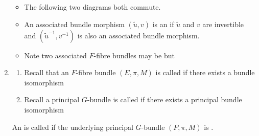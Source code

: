 \documentclass{article}
\begin{document}
\begin{enumerate}
\begin{itemize}
    \item {} The following two diagrams both commute.
\bse
{}
\qquad \quad
{}
\ese
\item {}
An associated bundle morphism $(\widetilde u,v)$ is an  if $\widetilde u$ and $v$ are invertible and $(\widetilde u^{-1},v^{-1})$ is also an associated bundle morphism.
\item Note two associated $F$-fibre bundles may be  but 
\end{itemize}

\item {}
{\tiny \begin{enumerate}
    \item Recall that an $F$-fibre bundle $(E,\pi,M)$ is called  if there exists a bundle isomorphism
\bse
{}
\ese
\item Recall a principal $G$-bundle is called  if there exists a principal bundle isomorphism
\bse
{}
\ese
\end{enumerate}}
An  is called  if the underlying principal $G$-bundle $(P,\pi,M)$ is .


\end{enumerate}
\end{document}
